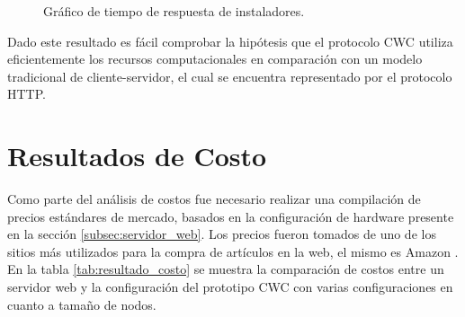 \begin{figure}[h!]
  \begin{center}    
    
    \caption{Gráfico de tiempo de respuesta de instaladores.}
  \label{fig:respuesta_instaladores}
  \end{center}
\end{figure}

Dado este resultado es fácil comprobar la hipótesis que el protocolo CWC utiliza eficientemente los recursos computacionales en comparación con un modelo tradicional de cliente-servidor, el cual se encuentra representado por el protocolo HTTP. 

\section{Resultados de Costo}
Como parte del análisis de costos fue necesario realizar una compilación de precios estándares de mercado, basados en la configuración de hardware presente en la sección \ref{subsec:servidor_web}. Los precios fueron tomados de uno de los sitios más utilizados para la compra de artículos en la web, el mismo es Amazon \cite{amazon:cpu, amazon:hd, amazon:memoria, amazon:network}. En la tabla \ref{tab:resultado_costo} se muestra la comparación de costos entre un servidor web y la configuración del prototipo CWC con varias configuraciones en cuanto a tamaño de nodos. 

